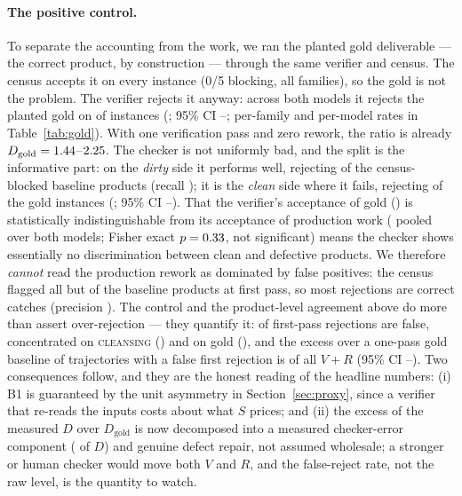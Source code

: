 \documentclass[11pt]{article}
\newcommand{\D}{\ensuremath{D}}
\newcommand{\SV}{\ensuremath{S}}
\newcommand{\VV}{\ensuremath{V}}
\newcommand{\RV}{\ensuremath{R}}
\newcommand{\famname}[1]{\textsc{#1}}
\begin{document}
\paragraph{The positive control.} To separate the accounting from the work, we ran the planted gold
deliverable --- the correct product, by construction --- through the same verifier and census. The
census accepts it on every instance (0/5 blocking, all families), so the gold is not the problem.
The verifier rejects it anyway: across both models it rejects the planted gold on
\VDgoldRej{} of instances (\VDgoldRejRate{}; 95\% CI \VDgoldRejLo--\VDgoldRejHi; per-family and
per-model rates in Table~\ref{tab:gold}). With one verification pass and zero rework, the ratio is
already $\D_{\text{gold}}=\VDgoldDmin$--$2.25$. The checker is not uniformly bad, and the
split is the informative part: on the \emph{dirty} side it performs well, rejecting \VDverCaught{}
of the \VDverBlocked{} census-blocked baseline products (recall \VDverRecall); it is the
\emph{clean} side where it fails, rejecting \VDgoldRej{} of the gold instances (\VDgoldRejRate{};
95\% CI \VDgoldRejLo--\VDgoldRejHi). That the
verifier's acceptance of gold (\VDgoldAcc{}) is statistically indistinguishable from its acceptance
of production work (\VDBaseAccPooled{} pooled over both models; Fisher exact $p=0.33$, not
significant) means the checker shows essentially no discrimination between clean and defective
products. We
therefore \emph{cannot} read the production rework as dominated by false positives: the census
flagged all but \VDfirstPass{} of the baseline products at first pass, so most rejections are correct
catches (precision \VDdetPrec{}). The control and the product-level agreement above do more than
assert over-rejection --- they quantify it: \VDdetFalseRej{} of first-pass rejections are false,
concentrated on \famname{cleansing} (\VDdetCleanseFalseRej{}) and on gold (\VDgoldRej{}), and
the excess over a one-pass gold baseline of trajectories with a false first rejection is
\VDchkShare{} of all $\VV+\RV$ (95\% CI \VDchkShareLo--\VDchkShareHi). Two consequences follow, and
they are the honest reading of the headline numbers: (i) B1 is guaranteed by the unit asymmetry in
Section~\ref{sec:proxy}, since a verifier that re-reads the inputs costs about what $\SV$ prices;
and (ii) the excess of the measured $\D$ over $\D_{\text{gold}}$ is now decomposed into a measured
checker-error component (\VDchkD{} of $\D$) and genuine defect repair, not assumed
wholesale; a stronger or human checker would move both $\VV$ and $\RV$, and the false-reject rate,
not the raw level, is the quantity to watch.
\end{document}
